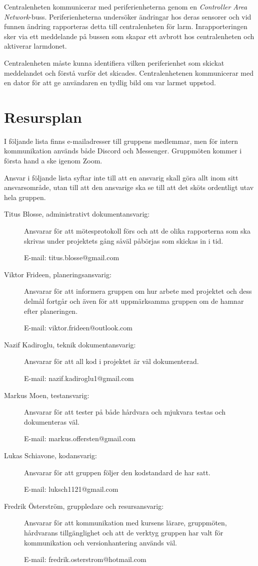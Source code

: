 \documentclass[a4paper]{article}
\begin{document}
Centralenheten kommunicerar med periferienheterna genom en \textit{Controller Area Network}-buss. Periferienheterna undersöker ändringar hos deras sensorer och vid funnen ändring rapporteras detta till centralenheten för larm. Inrapporteringen sker via ett meddelande på bussen som skapar ett avbrott hos centralenheten och aktiverar larmdonet.

Centralenheten måste kunna identifiera vilken periferienhet som skickat meddelandet och förstå varför det skicades. Centralenhetenen kommunicerar med en dator för att ge användaren en tydlig bild om var larmet uppstod.

\section{Resursplan}

I följande lista finns e-mailadresser till gruppens medlemmar, men för intern kommunikation används både Discord och Messenger. Gruppmöten kommer i första hand a ske igenom Zoom.

Ansvar i följande lista syftar inte till att en ansvarig skall göra allt inom sitt ansvarsområde, utan till att den ansvarige ska se till att det sköts ordentligt utav hela gruppen.

\begin{description}
    \item[Titus Blosse, administrativt dokumentansvarig:] Ansvarar för att mötesprotokoll förs och att de olika rapporterna som ska skrivas under projektets gång såväl påbörjas som skickas in i tid.

    E-mail: titus.blosse@gmail.com

    \item[Viktor Frideen, planeringsansvarig:] Ansvarar för att informera gruppen om hur arbete med projektet och dess delmål fortgår och även för att uppmärksamma gruppen om de hamnar efter planeringen.

    E-mail: viktor.frideen@outlook.com

    \item[Nazif Kadiroglu, teknik dokumentansvarig:] Ansvarar för att all kod i projektet är väl dokumenterad.

    E-mail: nazif.kadiroglu1@gmail.com

    \item[Markus Moen, testansvarig:] Ansvarar för att tester på både hårdvara och mjukvara testas och dokumenteras väl.

    E-mail: markus.offersten@gmail.com

    \item[Lukas Schiavone, kodansvarig:] Ansvarar för att gruppen följer den kodstandard de har satt.

    E-mail: luksch1121@gmail.com

    \item[Fredrik Österström, gruppledare och resursansvarig:] Ansvarar för att kommunikation med kursens lärare, gruppmöten, hårdvarans tillgänglighet och att de verktyg gruppen har valt för kommunikation och versionhantering används väl.

    E-mail: fredrik.osterstrom@hotmail.com
\end{description}
\end{document}
